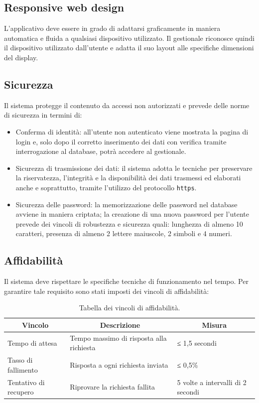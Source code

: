 \subsection{Responsive web design}
L'applicativo deve essere in grado di adattarsi graficamente in maniera automatica e fluida a qualsiasi dispositivo utilizzato. Il gestionale riconosce quindi il dispositivo utilizzato dall’utente e adatta il suo layout alle specifiche dimensioni del display.

\subsection{Sicurezza}
Il sistema protegge il contenuto da accessi non autorizzati e prevede delle norme di sicurezza in termini di:
\begin{itemize}
  \item Conferma di identità: all'utente non autenticato viene mostrata la pagina di login e, solo dopo il corretto inserimento dei dati con verifica tramite interrogazione al database, potrà accedere al gestionale. 
  \item Sicurezza di trasmissione dei dati: il sistema adotta le tecniche per preservare la riservatezza, l'integrità e la disponibilità dei dati trasmessi ed elaborati anche e soprattutto, tramite l'utilizzo del protocollo \texttt{https}.\cite{https}
  \item Sicurezza delle password: la memorizzazione delle password nel database avviene in maniera criptata; la creazione di una nuova password per l'utente prevede dei vincoli di robustezza e sicurezza quali: lunghezza di almeno 10 caratteri, presenza di almeno 2 lettere maiuscole, 2 simboli e 4 numeri.
\end{itemize}

\subsection{Affidabilità}
Il sistema deve rispettare le specifiche tecniche di funzionamento nel tempo.\cite{affidabilità}
Per garantire tale requisito sono stati imposti dei vincoli di affidabilità:

\begin{table}[h!]
\centering
\begin{tabular}{|l|l|l|}
\hline
\multicolumn{1}{|c|}{\textbf{Vincolo}} & \multicolumn{1}{c|}{\textbf{Descrizione}} & \multicolumn{1}{c|}{\textbf{Misura}} \\ \hline
Tempo di attesa                        & Tempo massimo di risposta alla richiesta  & ≤ 1,5 secondi                        \\ \hline
Tasso di fallimento                    & Risposta a ogni richiesta inviata         & ≤ 0,5\%                              \\ \hline
Tentativo di recupero                  & Riprovare la richiesta fallita            & 5 volte a intervalli di 2 secondi    \\ \hline
\end{tabular}
\caption{Tabella dei vincoli di affidabilità.}
\label{}
\end{table}

